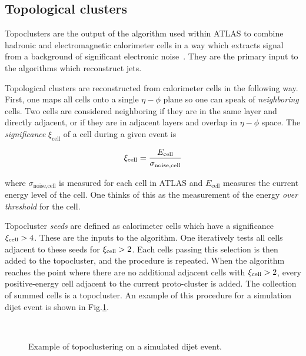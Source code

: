 \subsection{Topological clusters}\label{sec:topoclusters}

Topoclusters are the output of the algorithm used within ATLAS to combine hadronic and electromagnetic calorimeter cells in a way which extracts signal from a background of significant electronic noise~\cite{PERF-2014-07}.
They are the primary input to the algorithms which reconstruct jets.

Topological clusters are reconstructed from calorimeter cells in the following way.
First, one maps all cells onto a single $\eta-\phi$ plane so one can speak of \textit{neighboring} cells.
Two cells are considered neighboring if they are in the same layer and directly adjacent, or if they are in adjacent layers and overlap in $\eta-\phi$ space.
The \textit{significance} $\xi_{\text{cell}}$ of a cell during a given event is

\begin{equation}
\xi_{\text{cell}} = \frac{E_{\text{cell}}}{\sigma_{\text{noise,cell}}}
\end{equation}

where $\sigma_{\text{noise,cell}}$ is measured for each cell in ATLAS and $E_{\text{cell}}$ measures the current energy level of the cell.
One thinks of this as the measurement of the energy \textit{over threshold} for the cell.

Topocluster \textit{seeds} are defined as calorimeter cells which have a significance $\xi_{\text{cell}} > 4 $.
These are the inputs to the algorithm.
One iteratively tests all cells adjacent to these seeds for $\xi_{\text{cell}} > 2$.
Each cells passing this selection is then added to the topocluster, and the procedure is repeated.
When the algorithm reaches the point where there are no additional adjacent cells with $\xi_{\text{cell}} > 2$, every positive-energy cell adjacent to the current proto-cluster is added.
The collection of summed cells is a topocluster.
An example of this procedure for a simulation dijet event is shown in Fig.\ref{fig:topocluster}.
\begin{figure}
\caption{Example of topoclustering on a simulated dijet event.} \label{fig:topocluster}
 \\
\end{figure}

